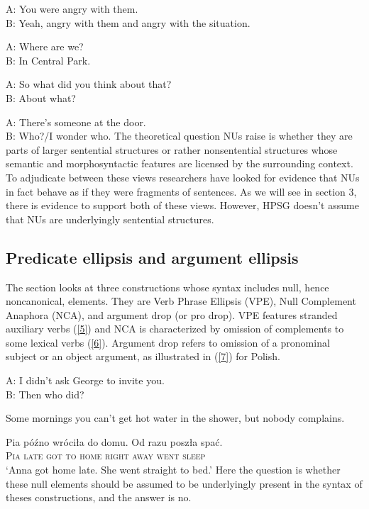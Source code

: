 \documentclass[output=paper]{langsci/langscibook}
\begin{document}
{\ea A: You were angry with them.\\ B: Yeah, angry with them and angry with the situation.\label{1}\z

\ea A: Where are we? \\B: In Central Park.\label{2}\z

\ea A: So what did you think about that?\\ B: About what? \label{3}\z

\ea A: There's someone at the door. \\B: Who?/I wonder who. \label{4}\z
The theoretical question NUs raise is whether they are parts of larger sentential structures or rather nonsentential structures whose semantic and morphosyntactic features are licensed by the surrounding context. To adjudicate between these views researchers have looked for evidence that NUs in fact behave as if they were fragments of sentences. As we will see in section 3, there is evidence to support both of these views. However, HPSG doesn't assume that NUs are underlyingly sentential structures.

\subsection{Predicate ellipsis and argument ellipsis}
The section looks at three constructions whose syntax includes null, hence noncanonical, elements. They are Verb Phrase Ellipsis (VPE), Null Complement Anaphora (NCA), and argument drop (or pro drop). VPE features stranded auxiliary verbs (\ref{5}) and NCA is characterized by omission of complements to some lexical verbs (\ref{6}). Argument drop refers to omission of a pronominal subject or an object argument, as illustrated in (\ref{7}) for Polish.

\ea A: I didn't ask George to invite you.\\B: Then who did?\label{5}\z

\ea Some mornings you can't get hot water in the shower, but nobody complains. \label{6} \z

\ea
\gll Pia p\'{o}\'{z}no wr\'{o}ci\l a do domu. {Od razu} posz\l a spa\'{c}.\\
\textsc{Pia} \textsc{late} \textsc{got} \textsc{to} \textsc{home} \textsc{right away} \textsc{went} \textsc{sleep}\\
\glt `Anna got home late. She went straight to bed.'
\label{7}
\z
Here the question is whether these null elements should be assumed to be underlyingly present in the syntax of theses constructions, and the answer is no.

}
\end{document}
